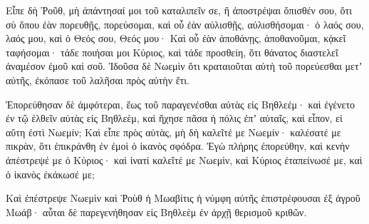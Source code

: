 {Εἶπε δὴ Ῥοῦθ, μὴ ἀπάντησαί μοι τοῦ καταλιπεῖν σε, ἢ ἀποστρέψαι ὄπισθέν σου, ὅτι σὺ ὅπου ἐὰν πορευθῇς, πορεύσομαι, καὶ οὗ ἐὰν αὐλισθῇς, αὐλισθήσομαι· ὁ λαός σου, λαός μου, καὶ ὁ Θεός σου, Θεός μου·
Καὶ οὗ ἐὰν ἀποθάνῃς, ἀποθανοῦμαι, κᾀκεῖ ταφήσομαι· τάδε ποιήσαι μοι Κύριος, καὶ τάδε προσθείη, ὅτι θάνατος διαστελεῖ ἀναμέσον ἐμοῦ καὶ σοῦ.
Ἰδοῦσα δὲ Νωεμὶν ὅτι κραταιοῦται αὐτὴ τοῦ πορεύεσθαι μετʼ αὐτῆς, ἐκόπασε τοῦ λαλῆσαι πρὸς αὐτὴν ἔτι.
\par }{\PP {}Ἐπορεύθησαν δὲ ἀμφότεραι, ἕως τοῦ παραγενέσθαι αὐτὰς εἰς Βηθλεέμ· καὶ ἐγένετο ἐν τῷ ἐλθεῖν αὐτὰς εἰς Βηθλεὲμ, καὶ ἤχησε πᾶσα ἡ πόλις ἐπʼ αὐταῖς, καὶ εἶπον, εἰ αὕτη ἐστὶ Νωεμίν;
Καὶ εἶπε πρὸς αὐτὰς, μὴ δὴ καλεῖτέ με Νωεμίν· καλέσατέ με πικρὰν, ὅτι ἐπικράνθη ἐν ἐμοὶ ὁ ἱκανὸς σφόδρα.
Ἐγὼ πλήρης ἐπορεύθην, καὶ κενὴν ἀπέστρεψέ με ὁ Κύριος· καὶ ἱνατί καλεῖτέ με Νωεμὶν, καὶ Κύριος ἐταπείνωσέ με, καὶ ὁ ἱκανὸς ἐκάκωσέ με;
\par }{\PP {}Καὶ ἐπέστρεψε Νωεμὶν καὶ Ῥοὺθ ἡ Μωαβίτις ἡ νύμφη αὐτῆς ἐπιστρέφουσαι ἐξ ἀγροῦ Μωάβ· αὗται δὲ παρεγενήθησαν εἰς Βηθλεὲμ ἐν ἀρχῇ θερισμοῦ κριθῶν.

}
